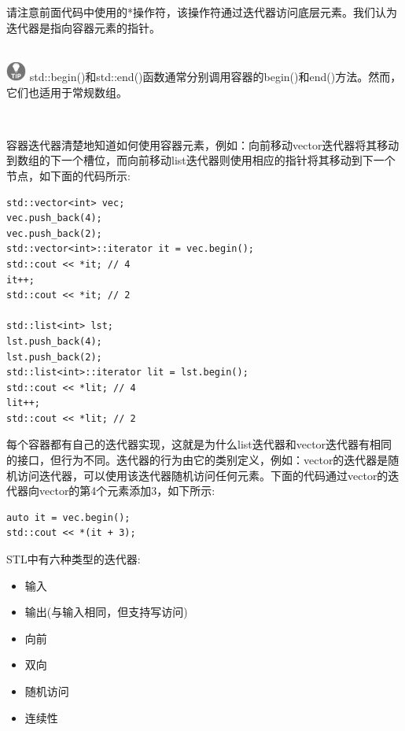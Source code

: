 请注意前面代码中使用的*操作符，该操作符通过迭代器访问底层元素。我们认为迭代器是指向容器元素的指针。 \par

\hspace*{\fill} \\ %
\includegraphics[width=0.05\textwidth]{images/tip}
std::begin()和std::end()函数通常分别调用容器的begin()和end()方法。然而，它们也适用于常规数组。 \par
\noindent\textbf{}\ \par

容器迭代器清楚地知道如何使用容器元素，例如：向前移动vector迭代器将其移动到数组的下一个槽位，而向前移动list迭代器则使用相应的指针将其移动到下一个节点，如下面的代码所示: \par

\begin{lstlisting}[caption={}]
std::vector<int> vec;
vec.push_back(4);
vec.push_back(2);
std::vector<int>::iterator it = vec.begin();
std::cout << *it; // 4
it++;
std::cout << *it; // 2

std::list<int> lst;
lst.push_back(4);
lst.push_back(2);
std::list<int>::iterator lit = lst.begin();
std::cout << *lit; // 4
lit++;
std::cout << *lit; // 2
\end{lstlisting}

每个容器都有自己的迭代器实现，这就是为什么list迭代器和vector迭代器有相同的接口，但行为不同。迭代器的行为由它的类别定义，例如：vector的迭代器是随机访问迭代器，可以使用该迭代器随机访问任何元素。下面的代码通过vector的迭代器向vector的第4个元素添加3，如下所示: \par

\begin{lstlisting}[caption={}]
auto it = vec.begin();
std::cout << *(it + 3);
\end{lstlisting}

STL中有六种类型的迭代器: \par

\begin{itemize}
	\item 输入
	\item 输出(与输入相同，但支持写访问)
	\item 向前
	\item 双向
	\item 随机访问
	\item 连续性
\end{itemize}

